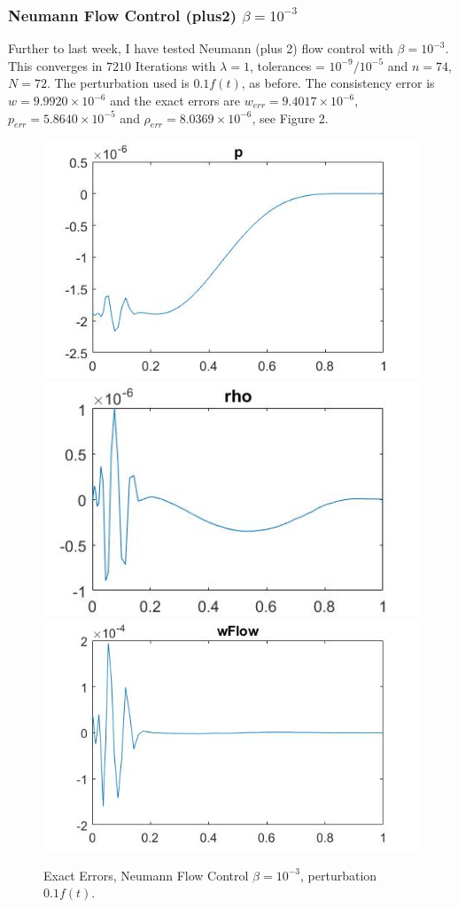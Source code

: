 \documentclass[11pt, a4paper]{article}
\theoremstyle{definition}
\begin{document}
\subsubsection*{Neumann Flow Control (plus2) $\beta = 10^{-3}$}
Further to last week, I have tested Neumann (plus 2) flow control with $\beta = 10^{-3}$. This converges in $7210$ Iterations with $\lambda = 1$, tolerances = $10^{-9}/10^{-5}$ and $n=74$, $N=72$. The perturbation used is $0.1f(t)$, as before. The consistency error is $w = 9.9920 \times 10^{-6}$ and the exact errors are $w_{err}= 9.4017 \times 10^{-6}$, $p_{err} = 5.8640 \times 10^{-5}$ and $\rho_{err} = 8.0369 \times 10^{-6}$, see Figure 2.
\begin{figure}[h]
	\includegraphics[scale=0.3]{KalNp1.jpg}
	\includegraphics[scale=0.3]{KalNrho1.jpg}
	\includegraphics[scale=0.3]{KalNw1.jpg}
	\caption{Exact Errors, Neumann Flow Control $\beta = 10^{-3}$, perturbation $0.1f(t)$.}
\end{figure}
\end{document}
